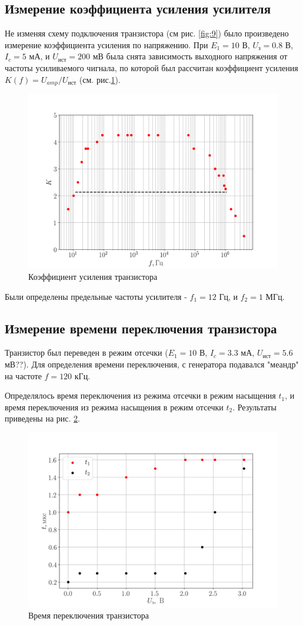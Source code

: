 \subsection{Измерение коэффициента усиления усилителя}
Не изменяя схему подключения транзистора (см рис. \ref{fig:9}) было произведено измерение коэффициента усиления по напряжению.
При $E_1 = 10$ В, $U_{\text{з}} = 0.8$ В, $I_c = 5$ мА, и $U_{\text{ист}} = 200$ мВ была снята зависимость
выходного напряжения от частоты усиливаемого чигнала, по которой был рассчитан коэффициент усиления $K(f) =
U_{amp}/U_{\text{ист}}$ (см. рис.\ref{fig:11}).

\begin{figure}[h!]
	\centering
	\includegraphics[width=0.8\linewidth]{fig/task4.png}
	\caption{Коэффициент усиления транзистора}
	\label{fig:11}
\end{figure}
Были определены предельные частоты усилителя - $f_1 = 12$ Гц, и $f_2 = 1$ МГц.

\subsection{Измерение времени переключения транзистора}
Транзистор был переведен в режим отсечки ($E_1 = 10$ В, $I_c = 3.3$ мА, $U_{\text{ист}} = 5.6$ мВ??). Для
определения времени переключения, с генератора подавался "меандр" на частоте $f = 120$ кГц.

Определялось время переключения из режима отсечки в режим насыщения $t_1$, и время переключения из режима насыщения в
режим отсечки $t_2$. Результаты приведены на рис. \ref{fig:12}.
\begin{figure}[h!]
	\centering
	\includegraphics[width=0.8\linewidth]{fig/task6.png}
	\caption{Время переключения транзистора}
	\label{fig:12}
\end{figure}


